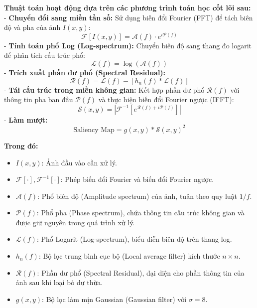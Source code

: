 \textbf{Thuật toán hoạt động dựa trên các phương trình toán học cốt lõi sau:}\\
- \textbf{Chuyển đổi sang miền tần số:} Sử dụng biến đổi Fourier (FFT) để tách biên độ và pha của ảnh $I(x,y)$:
\begin{equation}
\mathcal{F}[I(x,y)] = \mathcal{A}(f) \cdot e^{i\mathcal{P}(f)}
\end{equation}
- \textbf{Tính toán phổ Log (Log-spectrum): }Chuyển biên độ sang thang đo logarit để phân tích cấu trúc phổ:
\begin{equation}
\mathcal{L}(f) = \log(\mathcal{A}(f))
\end{equation}
- \textbf{Trích xuất phần dư phổ (Spectral Residual): }
\begin{equation}
\mathcal{R}(f) = \mathcal{L}(f) - [h_n(f) * \mathcal{L}(f)]
\end{equation}
- \textbf{Tái cấu trúc trong miền không gian:} Kết hợp phần dư phổ $\mathcal{R}(f)$ với thông tin pha ban đầu $\mathcal{P}(f)$ và thực hiện biến đổi Fourier ngược (IFFT):
\begin{equation}
\mathcal{S}(x,y) = |\mathcal{F}^{-1}[e^{\mathcal{R}(f) + i\mathcal{P}(f)}]|
\end{equation}
- \textbf{Làm mượt:} 
\begin{equation}
\text{Saliency Map} = g(x,y) * \mathcal{S}(x,y)^2
\end{equation}

\noindent \textbf{Trong đó:}
\begin{itemize}
    \item $I(x,y)$: Ảnh đầu vào cần xử lý.
    \item $\mathcal{F}[\cdot], \mathcal{F}^{-1}[\cdot]$: Phép biến đổi Fourier và biến đổi Fourier ngược.
    \item $\mathcal{A}(f)$: Phổ biên độ (Amplitude spectrum) của ảnh, tuân theo quy luật $1/f$.
    \item $\mathcal{P}(f)$: Phổ pha (Phase spectrum), chứa thông tin cấu trúc không gian và được giữ nguyên trong quá trình xử lý.
    \item $\mathcal{L}(f)$: Phổ Logarit (Log-spectrum), biểu diễn biên độ trên thang log.
    \item $h_n(f)$: Bộ lọc trung bình cục bộ (Local average filter) kích thước $n \times n$.
    \item $\mathcal{R}(f)$: Phần dư phổ (Spectral Residual), đại diện cho phần thông tin của ảnh sau khi loại bỏ dư thừa.
    \item $g(x,y)$: Bộ lọc làm mịn Gaussian (Gaussian filter) với $\sigma=8$.
\end{itemize}
